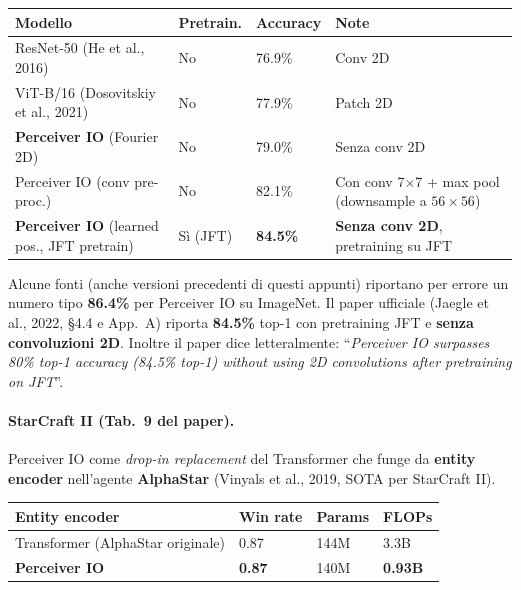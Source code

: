 \documentclass[
  11pt,
]{article}
\begin{document}
{\small
\begin{longtable}{@{}p{5cm} p{2cm} p{2.2cm} p{2cm}@{}}
\toprule
\textbf{Modello} & \textbf{Pretrain.} & \textbf{Accuracy} & \textbf{Note} \\
\midrule
\endhead
ResNet-50 (He et al., 2016) & No & 76.9\% & Conv 2D \\[2pt]
ViT-B/16 (Dosovitskiy et al., 2021) & No & 77.9\% & Patch 2D \\[2pt]
\textbf{Perceiver IO} (Fourier 2D) & No & 79.0\% & Senza conv 2D \\[2pt]
Perceiver IO (conv pre-proc.) & No & 82.1\% & Con conv 7$\times$7 + max pool (downsample a $56\times56$) \\[2pt]
\textbf{Perceiver IO} (learned pos., JFT pretrain) & Sì (JFT) & \textbf{84.5\%} & \textbf{Senza conv 2D}, pretraining su JFT \\
\bottomrule
\end{longtable}
}

\begin{notabox}[title={\textbf{Nota su ``86.4\%'' di ImageNet IO}}]
Alcune fonti (anche versioni precedenti di questi appunti) riportano per errore un numero tipo \textbf{86.4\%} per Perceiver IO su ImageNet. Il paper ufficiale (Jaegle et al., 2022, \S4.4 e App.\ A) riporta \textbf{84.5\%} top-1 con pretraining JFT e \textbf{senza convoluzioni 2D}. Inoltre il paper dice letteralmente: ``\emph{Perceiver IO surpasses 80\% top-1 accuracy (84.5\% top-1) without using 2D convolutions after pretraining on JFT}''.
\end{notabox}

\paragraph{StarCraft II (Tab.\ 9 del paper).} Perceiver IO come \emph{drop-in replacement} del Transformer che funge da \textbf{entity encoder} nell'agente \textbf{AlphaStar} (Vinyals et al., 2019, SOTA per StarCraft II).

{\small
\begin{longtable}{@{}p{3.5cm} p{2cm} p{2cm} p{2cm}@{}}
\toprule
\textbf{Entity encoder} & \textbf{Win rate} & \textbf{Params} & \textbf{FLOPs} \\
\midrule
\endhead
Transformer (AlphaStar originale) & 0.87 & 144M & 3.3B \\[2pt]
\textbf{Perceiver IO} & \textbf{0.87} & 140M & \textbf{0.93B} \\
\bottomrule
\end{longtable}
}
\end{document}
